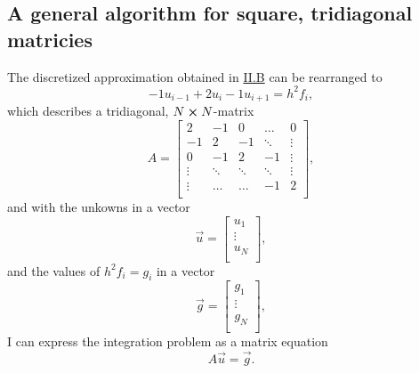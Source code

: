 \documentclass[english,notitlepage,reprint]{revtex4-1}  %
\begin{document}
\subsection{A general algorithm for square, tridiagonal matricies}\label{subsec:22}

The discretized approximation obtained in \hyperref[subsec:21]{II.B} can be rearranged to
$$
	-1u_{i-1}+2u_{i}-1u_{i+1}=h^{2}f_{i},
$$
which describes a tridiagonal, \(N\cross N\)-matrix
$$
	A =
	\begin{bmatrix}
	2 & -1 & 0 & \dots & 0 \\
	-1 & 2 & -1 & \ddots &\vdots \\
	0 & -1 & 2 & -1 & \vdots \\
	\vdots & \ddots & \ddots & \ddots & \vdots \\
	\vdots & \dots & \dots & -1 & 2 \\
	\end{bmatrix},
$$
and with the unkowns in a vector
$$
	\vec{u} =
	\begin{bmatrix}
		u_{1} \\
		\vdots \\
		u_{N} \\
	\end{bmatrix},
$$
and the values of \(h^{2}f_{i} = g_{i}\) in a vector
$$
	\vec{g} =
	\begin{bmatrix}
		g_{1} \\
		\vdots \\
		g_{N} \\
	\end{bmatrix},
$$
I can express the integration problem as a matrix equation
$$
	A\vec{u}=\vec{g}.
$$
\end{document}
